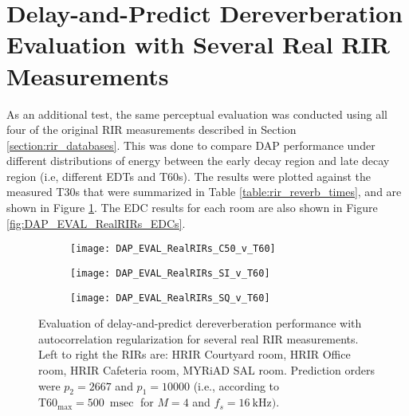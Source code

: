 \section{Delay-and-Predict Dereverberation Evaluation with Several Real RIR Measurements} \label{section:dap_eval_real_RIRs}

As an additional test, the same perceptual evaluation was conducted using all four of the original RIR measurements described in Section \ref{section:rir_databases}. This was done to compare DAP performance under different distributions of energy between the early decay region and late decay region (i.e, different EDTs and T60s). The results were plotted against the measured T30s that were summarized in Table \ref{table:rir_reverb_times}, and are shown in Figure \ref{fig:DAP_EVAL_RealRIRs}. The EDC results for each room are also shown in Figure \ref{fig:DAP_EVAL_RealRIRs_EDCs}.
	
\begin{figure}[H]
		\centering
		\begin{subfigure}[b]{0.47\textwidth}
			\centering
			\texttt{[image: DAP\_EVAL\_RealRIRs\_C50\_v\_T60]}
		\end{subfigure}
		\begin{subfigure}[b]{0.92\textwidth}
			\centering
			\texttt{[image: DAP\_EVAL\_RealRIRs\_SI\_v\_T60]}
		\end{subfigure}
		\begin{subfigure}[b]{0.92\textwidth}
			\centering
			\texttt{[image: DAP\_EVAL\_RealRIRs\_SQ\_v\_T60]}
		\end{subfigure}
		\caption[DAP evaluation for several real RIR measurements]{Evaluation of delay-and-predict dereverberation performance with autocorrelation regularization for several real RIR measurements. Left to right the RIRs are: HRIR Courtyard room, HRIR Office room, HRIR Cafeteria room, MYRiAD SAL room. Prediction orders were $p_2 = 2667$ and $p_1=10000$ (i.e., according to $\mathrm{T60}_{\mathrm{max}} = \qty{500}{\milli\sec}$ for $M=4$ and $f_s=\qty{16}{\kilo\hertz})$.}
		\label{fig:DAP_EVAL_RealRIRs}
\end{figure}

